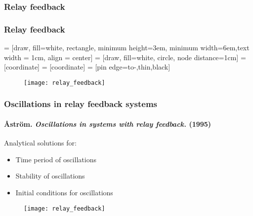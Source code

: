 \documentclass[11pt]{beamer}
\begin{document}
\subsubsection{Relay feedback}
\begin{frame}
\frametitle{Relay feedback}

 = [draw, fill=white, rectangle, 
    minimum height=3em, minimum width=6em,text width = 1cm, align = center]
 = [draw, fill=white, circle, node distance=1cm]
 = [coordinate]
 = [coordinate]
 = [pin edge={to-,thin,black}]

\begin{center}
\end{center}

\begin{figure}
\texttt{[image: relay\_feedback]}
\end{figure}

\end{frame}

\begin{frame}
\frametitle{Oscillations in relay feedback systems}
\framesubtitle{\r{A}str\"{o}m. \emph{Oscillations in systems with relay feedback.} (1995)}
Analytical solutions for:
\begin{itemize}
\item Time period of oscillations
\item Stability of oscillations
\item Initial conditions for oscillations
\end{itemize}
\begin{figure}
\texttt{[image: relay\_feedback]}
\end{figure}
\end{frame}
\end{document}
